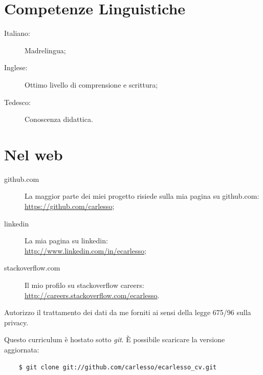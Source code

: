 \documentclass[pdftex, a4paper, 11pt]{article}
\begin{document}
\section*{Competenze Linguistiche}
\begin{description}
\item[Italiano:] Madrelingua;
\item[Inglese:] Ottimo livello di comprensione e scrittura;
\item[Tedesco:] Conoscenza didattica.
\end{description}

\section*{Nel web}
\begin{description}
\item[github.com] La maggior parte dei miei progetto risiede sulla mia pagina su github.com: \\ \mbox{\url{https://github.com/carlesso}};
\item[linkedin] La mia pagina su linkedin: \\ \url{http://www.linkedin.com/in/ecarlesso};
\item[stackoverflow.com] Il mio profilo su stackoverflow careers: \\ \url{http://careers.stackoverflow.com/ecarlesso}.
\end{description}

\vfill

Autorizzo il trattamento dei dati da me forniti ai sensi della legge
675/96 sulla privacy.

\vspace{1cm}

\footnotesize {Questo curriculum \`e hostato sotto {\em git}. \`E possibile scaricare la versione aggiornata:}
\begin{verbatim}
    $ git clone git://github.com/carlesso/ecarlesso_cv.git
\end{verbatim}
\end{document}
